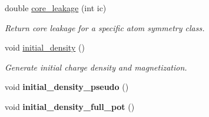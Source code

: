 \begin{DoxyCompactItemize}
double \hyperlink{classsirius_1_1_density_a83815f2fca3c06cfad1fc1f3e1a3db73}{core\+\_\+leakage} (int ic)
\begin{DoxyCompactList}\small\item\em Return core leakage for a specific atom symmetry class. \end{DoxyCompactList}\item 
void \hyperlink{classsirius_1_1_density_abea8fcd04749747c5abba5185420f413}{initial\+\_\+density} ()
\begin{DoxyCompactList}\small\item\em Generate initial charge density and magnetization. \end{DoxyCompactList}\item 
\hypertarget{classsirius_1_1_density_ae45356dcd88effd130b03724827ba427}{}void {\bfseries initial\+\_\+density\+\_\+pseudo} ()\label{classsirius_1_1_density_ae45356dcd88effd130b03724827ba427}

\item 
\hypertarget{classsirius_1_1_density_a2df9c61b1173bd89987926b3d249b94e}{}void {\bfseries initial\+\_\+density\+\_\+full\+\_\+pot} ()\label{classsirius_1_1_density_a2df9c61b1173bd89987926b3d249b94e}


\end{DoxyCompactItemize}
